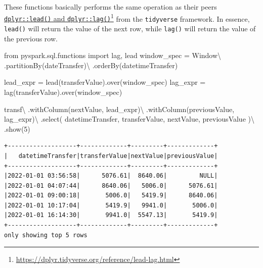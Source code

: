 \documentclass[
  11pt,
  letterpaper,
  DIV=11,
  numbers=noendperiod]{scrreprt}
\newenvironment{Shaded}{\begin{snugshade}}{\end{snugshade}}
\newcommand{\DecValTok}[1]{\textcolor[rgb]{0.68,0.00,0.00}{#1}}
\newcommand{\ImportTok}[1]{\textcolor[rgb]{0.00,0.46,0.62}{#1}}
\newcommand{\NormalTok}[1]{\textcolor[rgb]{0.00,0.23,0.31}{#1}}
\newcommand{\OperatorTok}[1]{\textcolor[rgb]{0.37,0.37,0.37}{#1}}
\newcommand{\StringTok}[1]{\textcolor[rgb]{0.13,0.47,0.30}{#1}}
\begin{document}
These functions basically performs the same operation as their peers
\href{https://dplyr.tidyverse.org/reference/lead-lag.html}{\texttt{dplyr::lead()}
and \texttt{dplyr::lag()}}\footnote{\url{https://dplyr.tidyverse.org/reference/lead-lag.html}}
from the \texttt{tidyverse} framework. In essence, \texttt{lead()} will
return the value of the next row, while \texttt{lag()} will return the
value of the previous row.

\begin{Shaded}
\begin{Highlighting}[]
\ImportTok{from}\NormalTok{ pyspark.sql.functions }\ImportTok{import}\NormalTok{ lag, lead}
\NormalTok{window\_spec }\OperatorTok{=}\NormalTok{ Window}\OperatorTok{\textbackslash{}}
\NormalTok{    .partitionBy(}\StringTok{\textquotesingle{}dateTransfer\textquotesingle{}}\NormalTok{)}\OperatorTok{\textbackslash{}}
\NormalTok{    .orderBy(}\StringTok{\textquotesingle{}datetimeTransfer\textquotesingle{}}\NormalTok{)}

\NormalTok{lead\_expr }\OperatorTok{=}\NormalTok{ lead(}\StringTok{\textquotesingle{}transferValue\textquotesingle{}}\NormalTok{).over(window\_spec)}
\NormalTok{lag\_expr }\OperatorTok{=}\NormalTok{ lag(}\StringTok{\textquotesingle{}transferValue\textquotesingle{}}\NormalTok{).over(window\_spec)}

\NormalTok{transf}\OperatorTok{\textbackslash{}}
\NormalTok{    .withColumn(}\StringTok{\textquotesingle{}nextValue\textquotesingle{}}\NormalTok{, lead\_expr)}\OperatorTok{\textbackslash{}}
\NormalTok{    .withColumn(}\StringTok{\textquotesingle{}previousValue\textquotesingle{}}\NormalTok{, lag\_expr)}\OperatorTok{\textbackslash{}}
\NormalTok{    .select(}
        \StringTok{\textquotesingle{}datetimeTransfer\textquotesingle{}}\NormalTok{,}
        \StringTok{\textquotesingle{}transferValue\textquotesingle{}}\NormalTok{,}
        \StringTok{\textquotesingle{}nextValue\textquotesingle{}}\NormalTok{,}
        \StringTok{\textquotesingle{}previousValue\textquotesingle{}}
\NormalTok{    )}\OperatorTok{\textbackslash{}}
\NormalTok{    .show(}\DecValTok{5}\NormalTok{)}
\end{Highlighting}
\end{Shaded}

\begin{verbatim}
+-------------------+-------------+---------+-------------+
|   datetimeTransfer|transferValue|nextValue|previousValue|
+-------------------+-------------+---------+-------------+
|2022-01-01 03:56:58|      5076.61|  8640.06|         NULL|
|2022-01-01 04:07:44|      8640.06|   5006.0|      5076.61|
|2022-01-01 09:00:18|       5006.0|   5419.9|      8640.06|
|2022-01-01 10:17:04|       5419.9|   9941.0|       5006.0|
|2022-01-01 16:14:30|       9941.0|  5547.13|       5419.9|
+-------------------+-------------+---------+-------------+
only showing top 5 rows
\end{verbatim}
\end{document}
